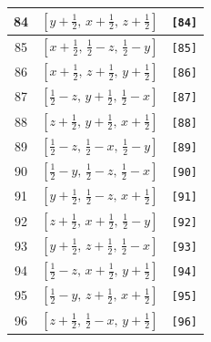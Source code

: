 \documentclass[fleqn,8pt]{jsarticle}
\begin{document}
\begin{longtable}{ccc}
84 & $\left[ y + \frac{1}{2},\, x + \frac{1}{2},\, z + \frac{1}{2} \right]$ & {\tt [84]} \\ \hline
85 & $\left[ x + \frac{1}{2},\, \frac{1}{2} - z,\, \frac{1}{2} - y \right]$ & {\tt [85]} \\ \hline
86 & $\left[ x + \frac{1}{2},\, z + \frac{1}{2},\, y + \frac{1}{2} \right]$ & {\tt [86]} \\ \hline
87 & $\left[ \frac{1}{2} - z,\, y + \frac{1}{2},\, \frac{1}{2} - x \right]$ & {\tt [87]} \\ \hline
88 & $\left[ z + \frac{1}{2},\, y + \frac{1}{2},\, x + \frac{1}{2} \right]$ & {\tt [88]} \\ \hline
89 & $\left[ \frac{1}{2} - z,\, \frac{1}{2} - x,\, \frac{1}{2} - y \right]$ & {\tt [89]} \\ \hline
90 & $\left[ \frac{1}{2} - y,\, \frac{1}{2} - z,\, \frac{1}{2} - x \right]$ & {\tt [90]} \\ \hline
91 & $\left[ y + \frac{1}{2},\, \frac{1}{2} - z,\, x + \frac{1}{2} \right]$ & {\tt [91]} \\ \hline
92 & $\left[ z + \frac{1}{2},\, x + \frac{1}{2},\, \frac{1}{2} - y \right]$ & {\tt [92]} \\ \hline
93 & $\left[ y + \frac{1}{2},\, z + \frac{1}{2},\, \frac{1}{2} - x \right]$ & {\tt [93]} \\ \hline
94 & $\left[ \frac{1}{2} - z,\, x + \frac{1}{2},\, y + \frac{1}{2} \right]$ & {\tt [94]} \\ \hline
95 & $\left[ \frac{1}{2} - y,\, z + \frac{1}{2},\, x + \frac{1}{2} \right]$ & {\tt [95]} \\ \hline
96 & $\left[ z + \frac{1}{2},\, \frac{1}{2} - x,\, y + \frac{1}{2} \right]$ & {\tt [96]} \\
\end{longtable}
\end{document}
